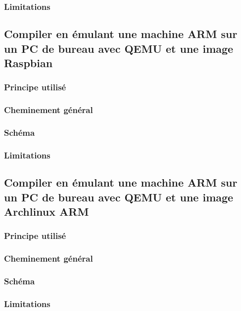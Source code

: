 \documentclass[11pt,a4paper]{article}
\begin{document}
\subsubsection{Limitations}




\subsection{Compiler en émulant une machine ARM sur un PC de bureau avec QEMU et une image Raspbian}

\subsubsection{Principe utilisé}

\subsubsection{Cheminement général}

\subsubsection{Schéma}

\subsubsection{Limitations}



\subsection{Compiler en émulant une machine ARM sur un PC de bureau avec QEMU et une image Archlinux ARM}

\subsubsection{Principe utilisé}

\subsubsection{Cheminement général}

\subsubsection{Schéma}

\subsubsection{Limitations}
\end{document}
